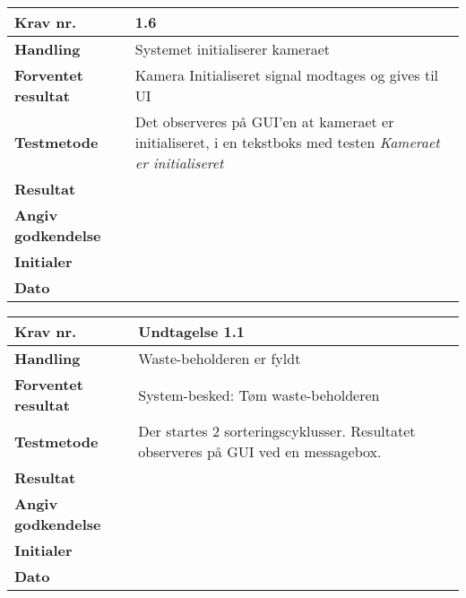 	\begin{center}
		\begin{longtable}{ | m{4cm}| m{8.5cm}|} 
			\hline
			\textbf{Krav nr.} & 1.6    \\ 
			\hline
			\textbf{Handling} &  Systemet initialiserer kameraet  \\
			\hline
			\textbf{Forventet resultat} &  Kamera Initialiseret signal modtages og gives til UI  \\
			\hline
			\textbf{Testmetode}  & Det observeres på GUI’en at kameraet er initialiseret, i en tekstboks med testen \textit{Kameraet er initialiseret}   \\
			\hline
			\textbf{Resultat}  &    \\
			\hline
			\textbf{Angiv godkendelse} &     \\
			\hline
			\textbf{Initialer} &     \\
			\hline
			\textbf{Dato} &    \\
			\hline
		\end{longtable}
	\end{center}
		
	\begin{center}
		\begin{longtable}{ | m{4cm}| m{8.5cm}|} 
			\hline
			\textbf{Krav nr.} & Undtagelse 1.1   \\ 
			\hline
			\textbf{Handling} & Waste-beholderen er fyldt  \\
			\hline
			\textbf{Forventet resultat} & System-besked: Tøm waste-beholderen  \\
			\hline
			\textbf{Testmetode}  & Der startes 2 sorteringscyklusser. Resultatet observeres på GUI ved en messagebox.   \\
			\hline
			\textbf{Resultat}  &    \\
			\hline
			\textbf{Angiv godkendelse} &     \\
			\hline
			\textbf{Initialer} &     \\
			\hline
			\textbf{Dato} &    \\
			\hline
		\end{longtable}
	\end{center}
	
